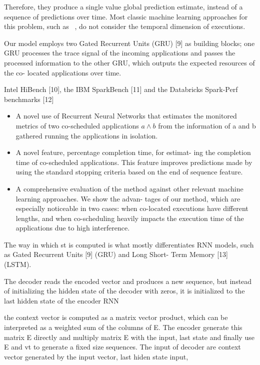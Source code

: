 \documentclass[UTF8]{article}
\begin{document}
Therefore, they produce a single value global prediction estimate, instead of a sequence of predictions over time. Most classic machine learning approaches for this problem, such as ~\cite{mishra2017esp, delimitrou2013paragon}, do not consider the temporal dimension of executions.

Our model employs two Gated Recurrent Units (GRU) [9] as building blocks; one GRU processes the trace signal of the incoming applications and passes the processed information to the other GRU, which outputs the expected resources of the co- located applications over time.

Intel HiBench [10], the IBM SparkBench [11] and the Databricks Spark-Perf benchmarks [12]

\begin{itemize}
	\item  A novel use of Recurrent Neural Networks that estimates the monitored metrics of two co-scheduled applications $a \wedge b$ from the information of a and b gathered running the applications in isolation.
	\item A novel feature, percentage completion time, for estimat- ing the completion time of co-scheduled applications. This feature improves predictions made by using the standard stopping criteria based on the end of sequence feature.
	\item A comprehensive evaluation of the method against other relevant machine learning approaches. We show the advan- tages of our method, which are especially noticeable in two cases: when co-located executions have different lengths, and when co-scheduling heavily impacts the execution time of the applications due to high interference.
\end{itemize}

The way in which st is computed is what mostly differentiates RNN models, such as Gated Recurrent Units [9] (GRU) and Long Short- Term Memory [13] (LSTM).

The decoder reads the encoded vector and produces a new sequence, but instead of initializing the hidden state of the decoder with zeros, it is initialized to the last hidden state of the encoder RNN

the context vector is computed as a matrix vector product, which can be interpreted as a weighted sum of the columns of E. The encoder generate this matrix E directly and multiply matrix E with the input, last state and finally use E and vt to generate a fixed size sequences. The input of decoder are context vector generated by the input vector, last hiden state input, 
\end{document}
